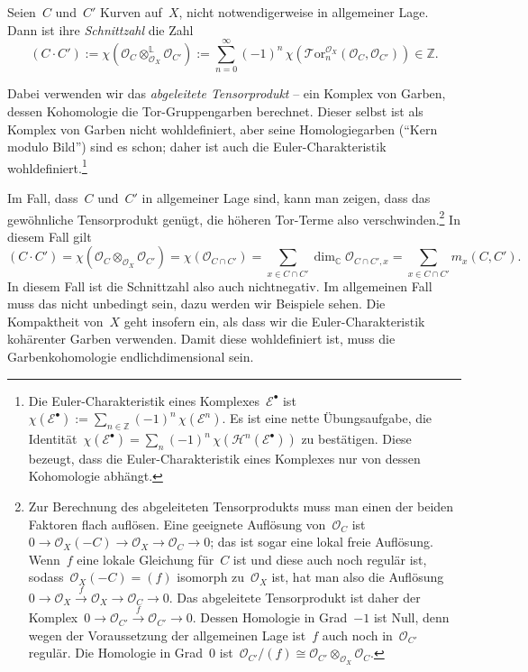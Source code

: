 \documentclass[a4paper,ngerman,12pt]{scrartcl}
\theoremstyle{definition}
\theoremstyle{plain}
\theoremstyle{remark}
\newcommand{\CC}{\mathbb{C}}
\newcommand{\ZZ}{\mathbb{Z}}
\newcommand{\E}{\mathcal{E}}
\renewcommand{\H}{\mathcal{H}}
\renewcommand{\O}{\mathcal{O}}
\begin{document}
\begin{defn}Seien~$C$ und~$C'$ Kurven auf~$X$, nicht notwendigerweise in
allgemeiner Lage. Dann ist ihre \emph{Schnittzahl} die Zahl
\[ (C \cdot C') := \chi(\O_C \otimes_{\O_X}^{\mathbb{L}} \O_{C'}) :=
  \sum_{n = 0}^\infty (-1)^n \, \chi(\mathcal{T}\!\mathrm{or}^{\O_X}_n(\O_C,\O_{C'})) \in \ZZ. \]
\end{defn}

Dabei verwenden wir das \emph{abgeleitete Tensorprodukt} -- ein Komplex von
Garben, dessen Kohomologie die Tor-Gruppengarben berechnet. Dieser selbst ist als
Komplex von Garben nicht wohldefiniert, aber seine Homologiegarben ("`Kern
modulo Bild"') sind es schon; daher ist auch die Euler-Charakteristik
wohldefiniert.\footnote{Die Euler-Charakteristik eines Komplexes~$\E^\bullet$
ist~$\chi(\E^\bullet) := \sum_{n \in \ZZ} (-1)^n \,\chi(\E^n)$. Es ist eine
nette Übungsaufgabe, die Identität~$\chi(\E^\bullet) = \sum_n (-1)^n
\,\chi(\H^n(\E^\bullet))$ zu bestätigen. Diese bezeugt, dass die
Euler-Charakteristik eines Komplexes nur von dessen Kohomologie abhängt.}

Im Fall, dass~$C$ und~$C'$ in allgemeiner Lage sind, kann man zeigen, dass das
gewöhnliche Tensorprodukt genügt, die höheren Tor-Terme also
verschwinden.\footnote{Zur Berechnung des abgeleiteten Tensorprodukts muss man
einen der beiden Faktoren flach auflösen. Eine geeignete Auflösung von~$\O_C$
ist~$0 \to \O_X(-C) \to \O_X \to \O_C \to 0$; das ist sogar eine lokal freie
Auflösung. Wenn~$f$ eine lokale Gleichung für~$C$ ist und diese auch noch
regulär ist, sodass~$\O_X(-C) = (f)$ isomorph zu~$\O_X$ ist, hat man also die
Auflösung~$0 \to \O_X \stackrel{f}{\to} \O_X \to \O_C \to 0$. Das abgeleitete
Tensorprodukt ist daher der Komplex~$0 \to \O_{C'} \stackrel{f}{\to} \O_{C'}
\to 0$. Dessen Homologie in Grad~$-1$ ist Null, denn wegen der Voraussetzung
der allgemeinen Lage ist~$f$ auch noch in~$\O_{C'}$ regulär. Die Homologie in
Grad~$0$ ist~$\O_{C'}/(f) \cong \O_{C'} \otimes_{\O_X} \O_C$.}
In diesem Fall gilt
\[ (C \cdot C') = \chi(\O_C \otimes_{\O_X} \O_{C'}) = \chi(\O_{C \cap C'}) =
  \sum_{x \in C \cap C'} \dim_\CC \O_{C \cap C',x} =
  \sum_{x \in C \cap C'} m_x(C,C'). \]
In diesem Fall ist die Schnittzahl also auch nichtnegativ. Im allgemeinen Fall
muss das nicht unbedingt sein, dazu werden wir Beispiele sehen. Die Kompaktheit
von~$X$ geht insofern ein, als dass wir die Euler-Charakteristik kohärenter
Garben verwenden. Damit diese wohldefiniert ist, muss die Garbenkohomologie
endlichdimensional sein.
\end{document}
